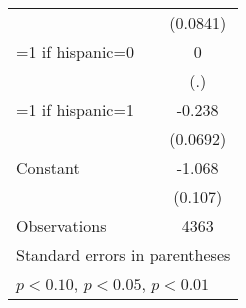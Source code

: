 {\begin{tabular}{l*{1}{c}}
                    &    (0.0841)         \\
[1em]
=1 if hispanic=0    &           0         \\
                    &         (.)         \\
[1em]
=1 if hispanic=1    &      -0.238\sym{***}\\
                    &    (0.0692)         \\
[1em]
Constant            &      -1.068\sym{***}\\
                    &     (0.107)         \\
\hline
Observations        &        4363         \\
\hline\hline
\multicolumn{2}{l}{\footnotesize Standard errors in parentheses}\\
\multicolumn{2}{l}{\footnotesize \sym{*} \(p<0.10\), \sym{**} \(p<0.05\), \sym{***} \(p<0.01\)}\\
\end{tabular}
}
